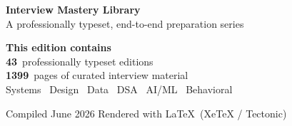 \documentclass[11pt]{article}
\begin{document}
\makecoverpage

\thispagestyle{empty}
\vspace*{2.2cm}
\begin{center}
{\headingfont\Huge\bfseries\color{ink} Interview Mastery Library}\\[6pt]
{\headingfont\large\color{ink2} A professionally typeset, end-to-end preparation series}\\[26pt]
\begin{tcolorbox}[enhanced,width=0.82\linewidth,colback=acc!6,colframe=acc,
  boxrule=0pt,leftrule=4pt,arc=3pt,left=16pt,right=16pt,top=12pt,bottom=12pt]
{\headingfont\large\color{ink}\bfseries This edition contains}\\[8pt]
{\Large\color{acc}\bfseries 43}~{\color{ink2}professionally typeset editions}\\[4pt]
{\Large\color{acc}\bfseries 1399}~{\color{ink2}pages of curated interview material}\\[4pt]
{\color{ink2} Systems \textbullet\ Design \textbullet\ Data \textbullet\ DSA \textbullet\ AI/ML \textbullet\ Behavioral}
\end{tcolorbox}
\end{center}
\vfill
\begin{center}{\color{ink2}\small Compiled June 2026 \quad\textbullet\quad Rendered with \LaTeX\ (XeTeX / Tectonic)}\end{center}
\clearpage
\end{document}
